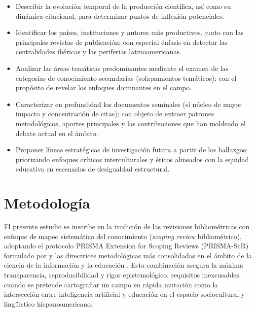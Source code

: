 \documentclass[spanish]{textolivre}
\begin{document}
\begin{itemize}
    \item Describir la evolución temporal de la producción científica, así como su dinámica citacional, para determinar puntos de inflexión potenciales.
    \item Identificar los países, instituciones y autores más productivos, junto con las principales revistas de publicación; con especial énfasis en detectar las centralidades ibéricas y las periferias latinoamericanas.
    \item Analizar las áreas temáticas predominantes mediante el examen de las categorías de conocimiento secundarias (solapamientos temáticos); con el propósito de revelar los enfoques dominantes en el campo.
    \item Caracterizar en profundidad los documentos seminales (el núcleo de mayor impacto y concentración de citas); con objeto de extraer patrones metodológicos, aportes principales y las contribuciones que han moldeado el debate actual en el ámbito.
    \item Proponer líneas estratégicas de investigación futura a partir de los hallazgos; priorizando enfoques críticos interculturales y éticos alineados con la equidad educativa en escenarios de desigualdad estructural.
\end{itemize}

\section{Metodología}
El presente estudio se inscribe en la tradición de las revisiones bibliométricas con enfoque de mapeo sistemático del conocimiento (\textit{scoping review} bibliométrico), adoptando el protocolo PRISMA Extension for Scoping Reviews (PRISMA-ScR) formulado por \textcite{tricco2018} y las directrices metodológicas más consolidadas en el ámbito de la ciencia de la información y la educación \cite{donthu2021, moralmunoz2020, zupic2015}. Esta combinación asegura la máxima transparencia, reproducibilidad y rigor epistemológico, requisitos inexcusables cuando se pretende cartografiar un campo en rápida mutación como la intersección entre inteligencia artificial y educación en el espacio sociocultural y lingüístico hispanoamericano.
\end{document}

